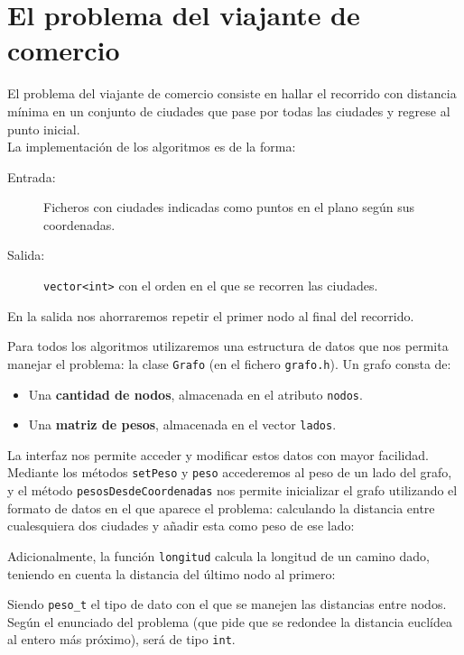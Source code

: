 \section{El problema del viajante de comercio}

El problema del viajante de comercio consiste en hallar el recorrido con distancia
mínima en un conjunto de ciudades que pase por todas las ciudades y regrese al punto
inicial. \\

La implementación de los algoritmos es de la forma:
\begin{description}
 \item[Entrada:] Ficheros con ciudades indicadas como puntos en el plano según sus
 coordenadas.
 \item[Salida:] \texttt{vector<int>} con el orden en el que se recorren las ciudades.
\end{description}

En la salida nos ahorraremos repetir el primer nodo al final del recorrido.

Para todos los algoritmos utilizaremos una estructura de datos que nos permita manejar
el problema: la clase \texttt{Grafo} (en el fichero \texttt{grafo.h}). Un grafo consta
de:

\begin{itemize}
  \item Una \textbf{cantidad de nodos}, almacenada en el atributo \texttt{nodos}.
  \item Una \textbf{matriz de pesos}, almacenada en el vector \texttt{lados}.
\end{itemize}

La interfaz nos permite acceder y modificar estos datos con mayor facilidad.
Mediante los métodos \texttt{setPeso} y \texttt{peso} accederemos al peso de un
lado del grafo, y el método \texttt{pesosDesdeCoordenadas} nos permite inicializar el
grafo utilizando el formato de datos en el que aparece el problema: calculando
la distancia entre cualesquiera dos ciudades y añadir esta como peso de ese lado:



Adicionalmente, la función \texttt{longitud} calcula la longitud de un camino dado,
teniendo en cuenta la distancia del último nodo al primero:



Siendo \texttt{peso\_t} el tipo de dato con el que se manejen las distancias entre
nodos. Según el enunciado del problema (que pide que se redondee la distancia
euclídea al entero más próximo), será de tipo \texttt{int}.

